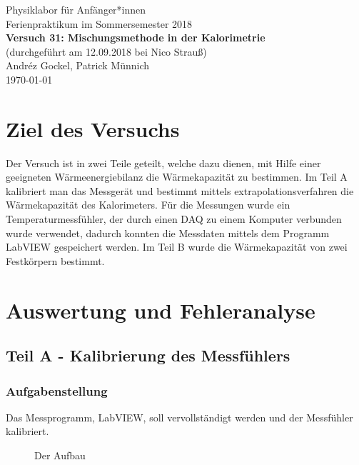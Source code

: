 \documentclass[11pt,a4paper]{article}
\begin{document}
{
\centering 
\large 
Physiklabor für Anf\"anger*innen \\
Ferienpraktikum im Sommersemester 2018 \\[4mm]
\textbf{\LARGE 
Versuch 31: Mischungsmethode in der Kalorimetrie
} \\[3mm]
(durchgef\"uhrt am 12.09.2018 bei Nico Strauß) \\
Andréz Gockel, Patrick M\"unnich\\
\today \\[10mm]
}

\section{Ziel des Versuchs}


Der Versuch ist in zwei Teile geteilt, welche dazu dienen, mit Hilfe einer geeigneten Wärmeenergiebilanz die Wärmekapazität zu bestimmen. Im Teil A kalibriert man das Messgerät und bestimmt mittels extrapolationsverfahren die Wärmekapazität des Kalorimeters. Für die Messungen wurde ein Temperaturmessfühler, der durch einen DAQ zu einem Komputer verbunden wurde verwendet, dadurch konnten die Messdaten mittels dem Programm LabVIEW gespeichert werden. Im Teil B wurde die Wärmekapazität von zwei Festkörpern bestimmt. 

\section{Auswertung und Fehleranalyse}

\subsection{Teil A - Kalibrierung des Messf\"uhlers}

\subsubsection{Aufgabenstellung}

Das Messprogramm, LabVIEW, soll vervollst\"andigt werden und der Messf\"uhler kalibriert.

\begin{figure}[ht!]
	\centering
  	\renewcommand\thefigure{B1}
	\caption{Der Aufbau}
	\label{Bild:1}
\end{figure}
\end{document}

